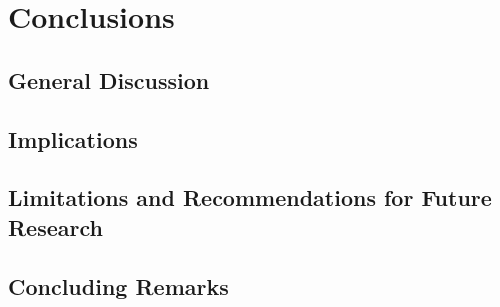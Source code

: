 \chapter{Conclusions}
\label{ch:conc}

\section{General Discussion}

\section{Implications}

\section{Limitations and Recommendations for Future Research}

\section{Concluding Remarks}